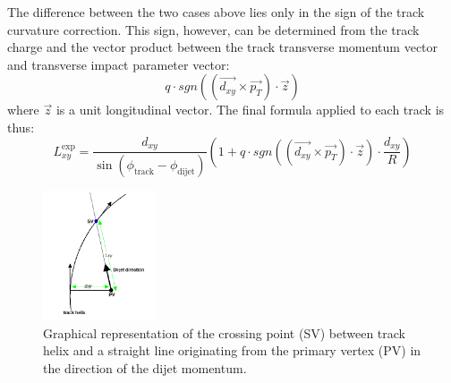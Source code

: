 \begin{enumerate}
\begin{itemize}
\begin{equation}
\end{equation} 
\end{itemize}
The difference between the two cases above lies only in the sign of the track curvature correction. This sign,
however,  can be
determined from the track charge and the vector product between the track transverse momentum vector and transverse
impact parameter vector:
\begin{equation}
q\cdot sgn\left(\left(\vec{d_{xy}}\times\vec{p_T}\right) \cdot \vec{z}\right)
\end{equation}   
where $\vec{z}$ is a unit longitudinal vector. The final formula applied to each track is thus:
\begin{equation}
 L_{xy}^\text{exp} = \frac{d_{xy}}{\sin\left(\phi_\text{track} - \phi_\text{dijet}\right)} \left(1 + q\cdot sgn\left(\left(\vec{d_{xy}}\times\vec{p_T}\right) \cdot \vec{z}\right) \cdot \frac{d_{xy}}{R}\right)
\label{eqn:lxy}
\end{equation}


\begin{figure}
\centering
\includegraphics[width=0.3\textwidth]{plots/guessLxy.png}
\caption{Graphical representation of the crossing point (SV) between track helix and a straight line originating from the primary vertex (PV) in the direction of the dijet momentum. \label{fig:guesslxydiagram}}
\end{figure} 


\end{enumerate}
